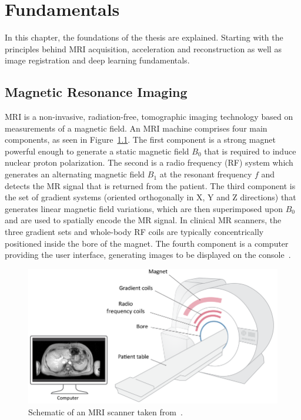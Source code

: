 
\chapter{Fundamentals} \label{Ch:Fundamentals}
In this chapter, the foundations of the thesis are explained. Starting with the principles behind MRI acquisition, acceleration and reconstruction as well as image registration and deep learning fundamentals.

\section{Magnetic Resonance Imaging} \label{Sec:MRI}
MRI is a non-invasive, radiation-free, tomographic imaging technology based on measurements of a magnetic field.  An MRI machine comprises four main components, as seen in Figure~\ref{fig:MRISchematic}. The first component is a strong magnet powerful enough to generate a static magnetic field $B_0$ that is required to induce nuclear proton polarization. The second is a radio frequency (RF) system which generates an alternating magnetic field $B_1$ at the resonant frequency $f$ and detects the MR signal that is returned from the patient. The third component is the set of gradient systems (oriented orthogonally in X, Y and Z directions) that generates linear magnetic field variations, which are then superimposed upon $B_0$ and are used to spatially encode the MR signal. In clinical MR scanners, the three gradient sets and whole-body RF coils are typically concentrically positioned inside the bore of the magnet. The fourth component is a computer providing the user interface, generating images to be displayed on the console~\cite{Serai2021}.

\begin{figure}[h] %
 	\centering
 	\includegraphics[width=\linewidth]{./Images/MRI-Schematic.png} 
 	\caption{Schematic of an MRI scanner taken from~\cite{Serai2021}.}
 	\label{fig:MRISchematic}
 \end{figure} 

